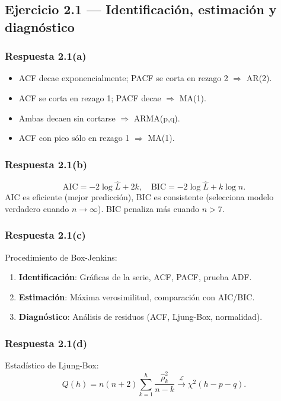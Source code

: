 \documentclass[12pt, letterpaper]{article}
\begin{document}
\subsection{Ejercicio 2.1 — Identificación, estimación y diagnóstico}

\subsubsection*{Respuesta 2.1(a)}
\begin{itemize}
    \item[(i)] ACF decae exponencialmente; PACF se corta en rezago 2 $\Rightarrow$ AR(2).
    \item[(ii)] ACF se corta en rezago 1; PACF decae $\Rightarrow$ MA(1).
    \item[(iii)] Ambas decaen sin cortarse $\Rightarrow$ ARMA(p,q).
    \item[(iv)] ACF con pico sólo en rezago 1 $\Rightarrow$ MA(1).
\end{itemize}

\subsubsection*{Respuesta 2.1(b)}

\[
\text{AIC} = -2\log\hat{L} + 2k, \quad \text{BIC} = -2\log\hat{L} + k\log n.
\]
AIC es eficiente (mejor predicción), BIC es consistente (selecciona modelo verdadero cuando $n\to\infty$). BIC penaliza más cuando $n>7$.

\subsubsection*{Respuesta 2.1(c)}

Procedimiento de Box-Jenkins:
\begin{enumerate}
    \item \textbf{Identificación}: Gráficas de la serie, ACF, PACF, prueba ADF.
    \item \textbf{Estimación}: Máxima verosimilitud, comparación con AIC/BIC.
    \item \textbf{Diagnóstico}: Análisis de residuos (ACF, Ljung-Box, normalidad).
\end{enumerate}

\subsubsection*{Respuesta 2.1(d)}

Estadístico de Ljung-Box:
\[
Q(h) = n(n+2)\sum_{k=1}^h \frac{\hat{\rho}_k^2}{n-k} \xrightarrow{\mathcal{L}} \chi^2(h-p-q).
\]
\end{document}
